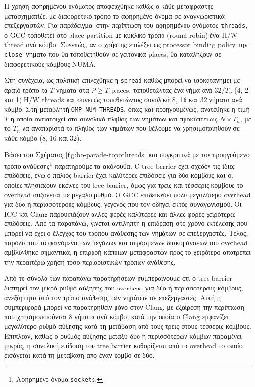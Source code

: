 Η χρήση αφηρημένου ονόματος αποφεύχθηκε καθώς ο κάθε μεταφραστής μετασχηματίζει με διαφορετικό τρόπο το αφηρημένο όνομα σε αναγνωριστικά επεξεργαστών. Για παράδειγμα, στην περίπτωση του αφηρημένου ονόματος \texttt{threads}, ο GCC τοποθετεί στο place partition με κυκλικό τρόπο (round-robin) ένα H/W thread ανά κόμβο. Συνεπώς, αν ο χρήστης επιλέξει ως processor binding policy την \texttt{close}, νήματα που θα τοποθετηθούν σε γειτονικά places, θα καταλήξουν σε διαφορετικούς κόμβους NUMA.

Στη συνέχεια, ως πολιτική επιλέχθηκε η \texttt{spread} καθώς μπορεί να ισοκατανήμει με αραιό τρόπο τα $T$ νήματα στα $P \geq T$ places, τοποθετώντας ένα νήμα ανά $32 / T_n$ (4, 2 και 1) H/W threads και συνεπώς τοποθετώντας συνολικά 8, 16 και 32 νήματα ανά κόμβο. Στη μεταβλητή \texttt{OMP\_NUM\_THREADS}, όπως και προηγουμένως, ανατέθηκε η τιμή $T$ η οποία αντιστοιχεί στο συνολικό πλήθος των νημάτων και προκύπτει ως $N \times T_n$, με το $T_n$ να αναπαριστά το πλήθος των νημάτων που θέλουμε να χρησιμοποιηθούν σε κάθε κόμβο (8, 16 και 32).

Βάσει του Σχήματος \ref{fig:bo-parade-topothreads} και συγκριτικά με τον προηγούμενο τρόπο ανάθεσης\footnote{Αφηρημένο όνομα \texttt{sockets}.} παρατηρούμε τα ακόλουθα. Ο tree barrier έχει σχεδόν τις ίδιες επιδόσεις, ενώ ο παλιός barrier έχει καλύτερες επιδόσεις για δύο κόμβους και οι οποίες πλησιάζουν εκείνες του tree barrier, όμως για τρεις και τέσσερις κόμβους το overhead αυξάνεται με μεγάλο ρυθμό. Ο GCC επιδεικνύει πολύ μεγαλύτερο overhead για δύο ή περισσότερους κόμβους, γεγονός που τον οδηγεί εκτός συναγωνισμού. Οι ICC και Clang παρουσιάζουν άλλες φορές καλύτερες και άλλες φορές χειρότερες επιδόσεις. Από τα παραπάνω, γίνεται αντιληπτή η επίδραση στο χρόνο εκτέλεσης που μπορεί να έχει ο έλεγχος του τρόπου ανάθεσης των νημάτων σε επεξεργαστές. Τέλος, παρόλο που το φαινόμενο των μεγάλων και απρόσμενων διακυμάνσεων του overhead αμβλύνθηκε σημαντικά, η επιρροή κάποιων μεταφραστών προς το χειρότερο αποτρέπει την περαιτέρω χρήση τόσο περιοριστικών τρόπων ανάθεσης.

Από το σύνολο των παραπάνω παρατηρήσεων συμπεραίνουμε ότι ο tree barrier διατηρεί τον μικρό ρυθμό αύξησης του overhead για δύο ή περισσότερους κόμβους, ανεξάρτητα από τον τρόπο ανάθεσης των νημάτων σε επεξεργαστές. Αυτή η συμπεριφορά μπορεί να παρατηρηθείν μόνο στον Clang, με εξαίρεση την περίπτωση που χρησιμοποιούνται 8 νήματα ανά κόμβο, κατά την οποία ο Clang εμφανίζει μεγαλύτερο ρυθμό αύξησης κατά τη μετάβαση από τους τρεις στους τέσσερις κόμβους. Επιπλέον, καθώς ο ρυθμός αύξησης μεταξύ δύο ή περισσότερων κόμβων παραμένει μικρός, η συνολική επίδοση του tree barrier καθορίζεται από το overhead το οποίο εισάγεται κατά τη μετάβαση από έναν κόμβο σε δύο.

